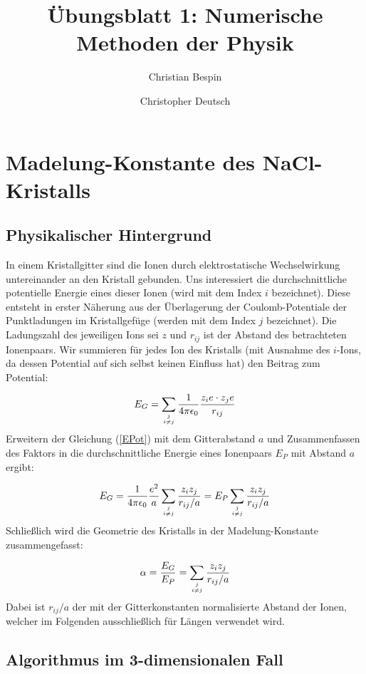 \documentclass[10pt,a4paper]{article}
\author{Christian Bespin \and Christopher Deutsch}
\title{Übungsblatt 1: Numerische Methoden der Physik}
\begin{document}
\maketitle

\section{Madelung-Konstante des NaCl-Kristalls}
\subsection{Physikalischer Hintergrund}
In einem Kristallgitter sind die Ionen durch elektrostatische Wechselwirkung
untereinander an den Kristall gebunden. Uns interessiert die durchschnittliche
potentielle Energie eines dieser Ionen (wird mit dem Index $i$ bezeichnet).
Diese entsteht in erster Näherung aus der Überlagerung der Coulomb-Potentiale
der Punktladungen im Kristallgefüge
(werden mit dem Index $j$ bezeichnet). Die Ladungszahl des jeweiligen Ions sei $z$
und $r_{ij}$ ist der Abstand des betrachteten Ionenpaars. Wir summieren für
jedes Ion des Kristalls (mit Ausnahme des $i$-Ions, da dessen Potential auf sich
selbst keinen Einfluss hat) den Beitrag zum Potential:

\begin{align}
\label{EPot}
E_G = \sum_{j\atop i \neq j} \frac{1}{4 \pi \epsilon_0}
\frac{z_i e \cdot z_j e}{r_{ij}}
\end{align}
Erweitern der Gleichung (\ref{EPot}) mit dem Gitterabstand $a$ und
Zusammenfassen des Faktors in die durchschnittliche Energie eines Ionenpaars
$E_P$ mit Abstand $a$ ergibt:

\begin{align}
E_G = \frac{1}{4 \pi \epsilon_0} \frac{e^2}{a} \sum_{j\atop i \neq j}
\frac{z_i z_j}{r_{ij}/a} = E_P \sum_{j\atop i \neq j} \frac{z_i z_j}{r_{ij}/a}
\end{align}
Schließlich wird die Geometrie des Kristalls in der Madelung-Konstante
zusammengefasst:

\begin{align}
\label{Madelungkonstante}
\alpha = \frac{E_G}{E_P} = \sum_{j\atop i \neq j} \frac{z_i z_j}{r_{ij}/a}
\end{align}
Dabei ist $r_{ij}/a$ der mit der Gitterkonstanten normalisierte Abstand der Ionen,
welcher im Folgenden ausschließlich für Längen verwendet wird.

\subsection{Algorithmus im 3-dimensionalen Fall}
\end{document}
